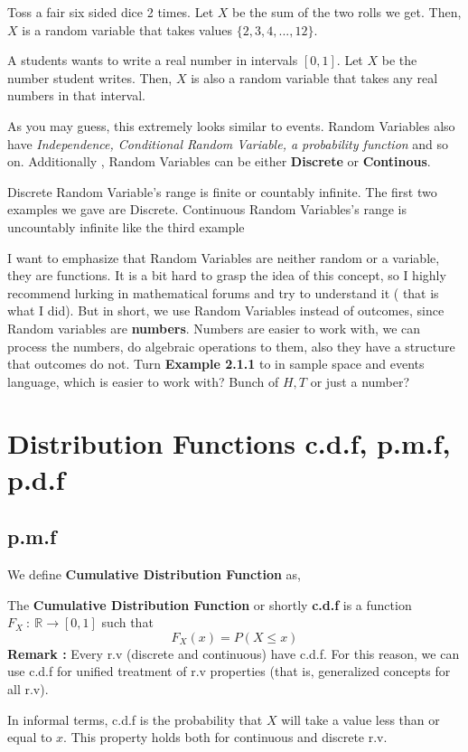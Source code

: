 \begin{example}
    Toss a fair six sided dice 2 times. Let $X$ be the sum of the two rolls we get. Then, $X$ is a random variable that takes values $\{2,3,4,...,12\}$.
\end{example}

\begin{example}
    A students wants to write a real number in intervals $[0,1]$. Let $X$ be the number student writes. Then, $X$ is also a random variable that takes any real numbers in that interval.
\end{example}

As you may guess, this extremely looks similar to events. Random Variables also have \textit{Independence, Conditional Random Variable, a probability function} and so on. Additionally , Random Variables can be either \textbf{Discrete} or \textbf{Continous}.
\par 
Discrete Random Variable's range is finite or countably infinite. The first two examples we gave are Discrete. Continuous Random Variables's range is uncountably infinite like the third example \newline

I want to emphasize  that Random Variables are neither random or a variable, they are functions. It is a bit hard to grasp the idea of this concept, so I highly recommend lurking in mathematical forums and try to understand it ( that is what I did). But in short, we use Random Variables instead of outcomes, since Random variables are \textbf{numbers}. Numbers are easier to work with, we can process the numbers, do algebraic operations to them, also they have a structure that outcomes do not.
Turn \textbf{ Example 2.1.1} to in sample space and events language, which is easier to work with? Bunch of $H,T$ or just a number?





\section{Distribution Functions c.d.f, p.m.f, p.d.f}
\subsection*{p.m.f}
We define  \textbf{Cumulative Distribution Function} as,

\begin{definition}
    The \textbf{Cumulative Distribution Function} or shortly \textbf{c.d.f} is a function $F_X \ : \ \mathbb{R} \rightarrow [0,1]$ such that
    \[ F_X(x) = P( X \le x) \]
    \textbf{Remark :} Every r.v (discrete and continuous) have c.d.f. For this reason, we can use c.d.f for unified treatment of r.v properties (that is, generalized concepts for all r.v).
\end{definition}
\par
In informal terms, c.d.f is the probability that $X$ will take a value less than or equal to $x$. This property holds both for continuous and discrete r.v.
\par 

